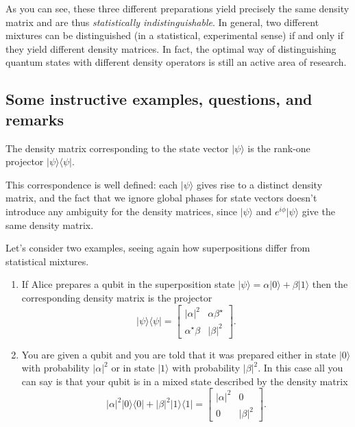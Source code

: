 \documentclass[fleqn,a4paper]{article}
\newenvironment{idea}{\everypar{\setlength{\parindent}{1.5em}}}{}
\theoremstyle{definition}
\theoremstyle{definition}
\theoremstyle{definition}
\theoremstyle{definition}
\theoremstyle{remark}
\begin{document}
As you can see, these three different preparations yield precisely the same density matrix and are thus \emph{statistically indistinguishable}.
In general, two different mixtures can be distinguished (in a statistical, experimental sense) if and only if they yield different density matrices.
In fact, the optimal way of distinguishing quantum states with different density operators is still an active area of research.

\hypertarget{some-instructive-examples-questions-and-remarks}{%
\subsection{Some instructive examples, questions, and remarks}\label{some-instructive-examples-questions-and-remarks}}

\begin{idea}
The density matrix corresponding to the state vector \(|\psi\rangle\) is the rank-one projector \(|\psi\rangle\langle\psi|\).

\end{idea}

This correspondence is well defined: each \(|\psi\rangle\) gives rise to a distinct density matrix, and the fact that we ignore global phases for state vectors doesn't introduce any ambiguity for the density matrices, since \(|\psi\rangle\) and \(e^{i\phi}|\psi\rangle\) give the same density matrix.

Let's consider two examples, seeing again how superpositions differ from statistical mixtures.

\begin{enumerate}
\def\labelenumi{\arabic{enumi}.}
\item
  If Alice prepares a qubit in the superposition state \(|\psi\rangle = \alpha|0\rangle + \beta|1\rangle\) then the corresponding density matrix is the projector
  \[
     |\psi\rangle\langle\psi|
     = \begin{bmatrix}
       |\alpha|^2 & \alpha\beta^\star
     \\\alpha^\star\beta & |\beta|^2
     \end{bmatrix}.
   \]
\item
  You are given a qubit and you are told that it was prepared either in state \(|0\rangle\) with probability \(|\alpha|^2\) or in state \(|1\rangle\) with probability \(|\beta|^2\).
  In this case all you can say is that your qubit is in a mixed state described by the density matrix
  \[
     |\alpha|^2|0\rangle\langle 0| + |\beta|^2|1\rangle\langle 1|
     = \begin{bmatrix}
       |\alpha|^2 & 0
     \\0 & |\beta|^2
     \end{bmatrix}.
   \]
\end{enumerate}
\end{document}
